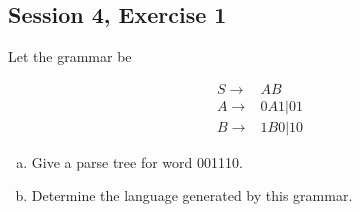 \subsection{Session 4, Exercise 1}


Let the grammar be

\begin{align*}
S \rightarrow& AB\\
A \rightarrow& 0A1|01\\
B \rightarrow& 1B0|10
\end{align*}

\begin{enumerate}[(a)]
\item Give a parse tree for word 001110.
\item Determine the language generated by this grammar.
\end{enumerate}

